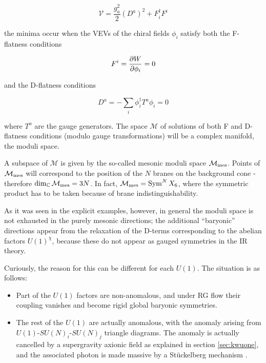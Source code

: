 \begin{equation}
	\mathcal{V} = \frac{g_a^2}{2} (D^a)^2 + F^\dagger_i F^i
	\label{}
\end{equation}

the minima occur when the VEVs of the chiral fields $\phi_i$ satisfy both the F-flatness conditions

\begin{equation}
	F^i = \frac{\partial W}{\partial\phi_i} = 0
	\label{}
\end{equation}

and the D-flatness conditions

\begin{equation}
	D^a = - \sum_i \phi_i^\dagger T^a \phi_i = 0
\end{equation}

where $T^a$ are the gauge generators. The space $\mathcal{M}$ of solutions of both F and D-flatness conditions (modulo gauge transformations) will be a complex manifold, the moduli space.

A subspace of $\mathcal{M}$ is given by the so-called mesonic moduli space $\mathcal{M}_\mathrm{mes}$. Points of $\mathcal{M}_\mathrm{mes}$ will correspond to the position of the $N$ branes on the background cone - therefore $\dim_\mathbb{C} \mathcal{M}_\mathrm{mes} = 3N$. In fact, $\mathcal{M}_\mathrm{mes} = \operatorname{Sym}^N X_6$, where the symmetric product has to be taken because of brane indistinguishability.

As it was seen in the explicit examples, however, in general the moduli space is not exhausted in the purely mesonic directions; the additional ``baryonic'' directions appear from the relaxation of the D-terms corresponding to the abelian factors $U(1)^\chi$, because these do not appear as gauged symmetries in the IR theory.

Curiously, the reason for this can be different for each $U(1)$. The situation is as follows:

\begin{itemize}
	\item Part of the $U(1)$ factors are non-anomalous, and under RG flow their coupling vanishes and become rigid global baryonic symmetries.
	\item The rest of the $U(1)$ are actually anomalous, with the anomaly arising from $U(1)$-$SU(N)_i$-$SU(N)_j$ triangle diagrams. The anomaly is actually cancelled by a supergravity axionic field as explained in section \ref{sec:kwuone}, and the associated photon is made massive by a St\"uckelberg mechanism \cite{Martelli:sbv}.
\end{itemize}

